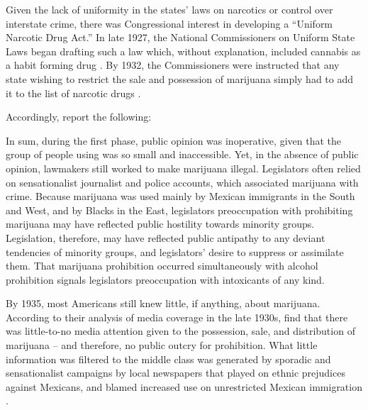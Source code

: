 Given the lack of uniformity in the states' laws on narcotics or control over interstate crime, there was Congressional interest in developing a ``Uniform Narcotic Drug Act.'' In late 1927, the National Commissioners on Uniform State Laws began drafting such a law which, without explanation, included cannabis as a habit forming drug  \citep{bonnie_and_whitebread_1970}. By 1932, the Commissioners were instructed that any state wishing to restrict the sale and possession of marijuana simply had to add it to the list of narcotic drugs \citep{terry_and_pellens_1928}. 

Accordingly, \citet{bonnie_and_whitebread_1970} report the following:

\begin{quotation}
\begin{singlespace}
\end{singlespace}
\end{quotation}


In sum, during the first phase, public opinion was inoperative, given that the group of people using was so small and inaccessible. Yet, in the absence of public opinion, lawmakers still worked to make marijuana illegal. Legislators often relied on sensationalist journalist and police accounts, which associated marijuana with crime. Because marijuana was used mainly by Mexican immigrants in the South and West, and by Blacks in the East, legislators preoccupation with prohibiting marijuana may have reflected public hostility towards minority groups. Legislation, therefore, may have reflected public antipathy to any deviant tendencies of minority groups, and legislators' desire to suppress or assimilate them. That marijuana prohibition occurred simultaneously with alcohol prohibition signals legislators preoccupation with intoxicants of any kind. 





By 1935, most Americans still knew little, if anything, about marijuana. According to their analysis of media coverage in the late 1930s, \citet{bonnie_and_whitebread_1970} find that there was little-to-no media attention given to the possession, sale, and distribution of marijuana -- and therefore, no public outcry for prohibition. What little information was filtered to the middle class was generated by sporadic and sensationalist campaigns by local newspapers that played on ethnic prejudices against Mexicans, and blamed increased use on unrestricted Mexican immigration \citep{bonnie_and_whitebread_1970}. 


